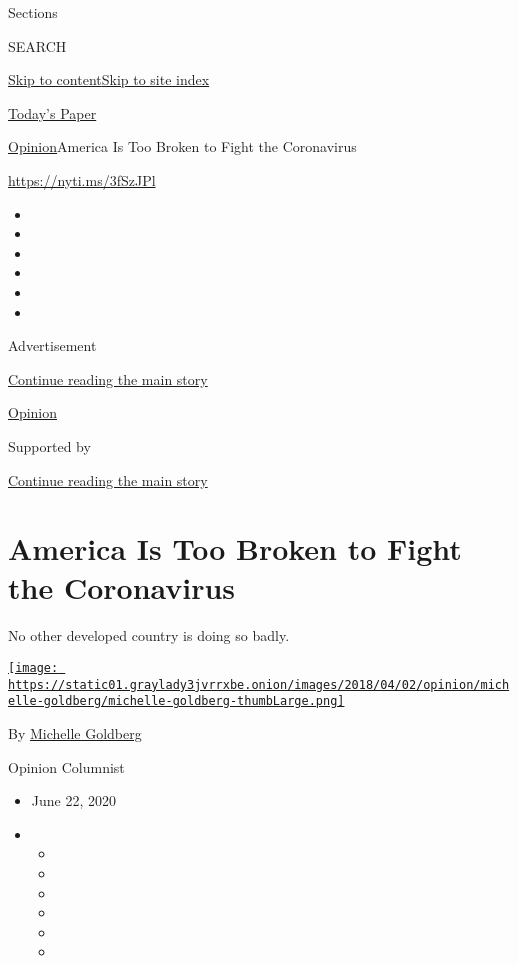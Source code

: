 Sections

SEARCH

\protect\hyperlink{site-content}{Skip to
content}\protect\hyperlink{site-index}{Skip to site index}

\href{https://myaccount.nytimes3xbfgragh.onion/auth/login?response_type=cookie\&client_id=vi}{}

\href{https://www.nytimes3xbfgragh.onion/section/todayspaper}{Today's
Paper}

\href{/section/opinion}{Opinion}\textbar{}America Is Too Broken to Fight
the Coronavirus

\url{https://nyti.ms/3fSzJPl}

\begin{itemize}
\item
\item
\item
\item
\item
\item
\end{itemize}

Advertisement

\protect\hyperlink{after-top}{Continue reading the main story}

\href{/section/opinion}{Opinion}

Supported by

\protect\hyperlink{after-sponsor}{Continue reading the main story}

\hypertarget{america-is-too-broken-to-fight-the-coronavirus}{%
\section{America Is Too Broken to Fight the
Coronavirus}\label{america-is-too-broken-to-fight-the-coronavirus}}

No other developed country is doing so badly.

\href{https://www.nytimes3xbfgragh.onion/by/michelle-goldberg}{\texttt{[image: https://static01.graylady3jvrrxbe.onion/images/2018/04/02/opinion/michelle-goldberg/michelle-goldberg-thumbLarge.png]}}

By
\href{https://www.nytimes3xbfgragh.onion/by/michelle-goldberg}{Michelle
Goldberg}

Opinion Columnist

\begin{itemize}
\item
  June 22, 2020
\item
  \begin{itemize}
  \item
  \item
  \item
  \item
  \item
  \item
  \end{itemize}
\end{itemize}

